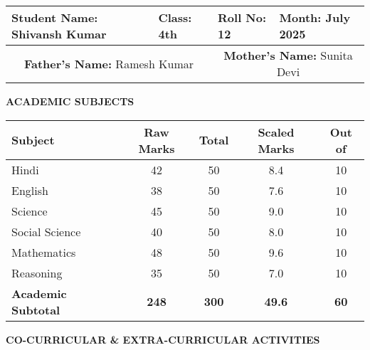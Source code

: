 \documentclass[a4paper,11pt]{article}
\newcommand{\header}[1]{\textbf{\color{navy}#1}}
\newcommand{\subheader}[1]{\textbf{\color{darkgreen}#1}}
\begin{document}
\vspace{0.3cm}

\begin{center}
\begin{tabularx}{\textwidth}{|X|X|X|X|}
\hline
\rowcolor{lightgray}
\header{Student Name:} Shivansh Kumar & \header{Class:} 4th & \header{Roll No:} 12 & \header{Month:} July 2025 \\
\hline
\multicolumn{2}{|c|}{\header{Father's Name:} Ramesh Kumar} & \multicolumn{2}{c|}{\header{Mother's Name:} Sunita Devi} \\
\hline
\end{tabularx}
\end{center}

\vspace{0.3cm}

\begin{center}
\subheader{ACADEMIC SUBJECTS}
\end{center}

\begin{center}
\begin{tabularx}{\textwidth}{|X|c|c|c|c|}
\hline
\rowcolor{navy!20}
\textbf{\color{white}Subject} & \textbf{\color{white}Raw Marks} & \textbf{\color{white}Total} & \textbf{\color{white}Scaled Marks} & \textbf{\color{white}Out of} \\
\hline
Hindi & 42 & 50 & 8.4 & 10 \\
\hline
English & 38 & 50 & 7.6 & 10 \\
\hline
Science & 45 & 50 & 9.0 & 10 \\
\hline
Social Science & 40 & 50 & 8.0 & 10 \\
\hline
Mathematics & 48 & 50 & 9.6 & 10 \\
\hline
Reasoning & 35 & 50 & 7.0 & 10 \\
\hline
\rowcolor{saffron!20}
\textbf{Academic Subtotal} & \textbf{248} & \textbf{300} & \textbf{49.6} & \textbf{60} \\
\hline
\end{tabularx}
\end{center}

\vspace{0.3cm}

\begin{center}
\subheader{CO-CURRICULAR \& EXTRA-CURRICULAR ACTIVITIES}
\end{center}
\end{document}
